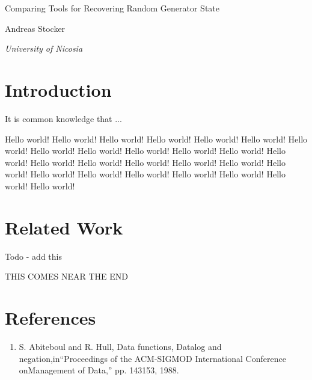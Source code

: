 \documentclass{article}
\begin{document}
    \begin{center}
    \end{center}
    
    \addvspace{20mm}
        
    \begin{center}
        \huge Comparing Tools for Recovering Random Generator State
    \end{center}
    
    \begin{center}
    \end{center}
       
    \begin{center}
        \large Andreas Stocker
    \end{center}
    
    \begin{center}
        \small \emph {University of Nicosia}
    \end{center}

    \addvspace{15mm}

    \begin{multicols}{2}


    \section{Introduction}
It is common knowledge that ...

Hello world!
Hello world!
Hello world!
Hello world!
Hello world!
Hello world!
Hello world!
Hello world!
Hello world!
Hello world!
Hello world!
Hello world!
Hello world!
Hello world!
Hello world!
Hello world!
Hello world!
Hello world!
Hello world!
Hello world!
Hello world!
Hello world!
Hello world!
Hello world!
Hello world!
Hello world!
    
    \section{Related Work}

    Todo - add this

    THIS COMES NEAR THE END

    
    \end{multicols}

    \break
    \section*{References}

    \begin{enumerate}

    \item S.  Abiteboul  and  R.  Hull,  Data  functions,  Datalog  and  negation,in``Proceedings  of  the  ACM-SIGMOD  International  Conference  onManagement of Data,'' pp. 143153, 1988.

    \end{enumerate}
    
\end{document}
